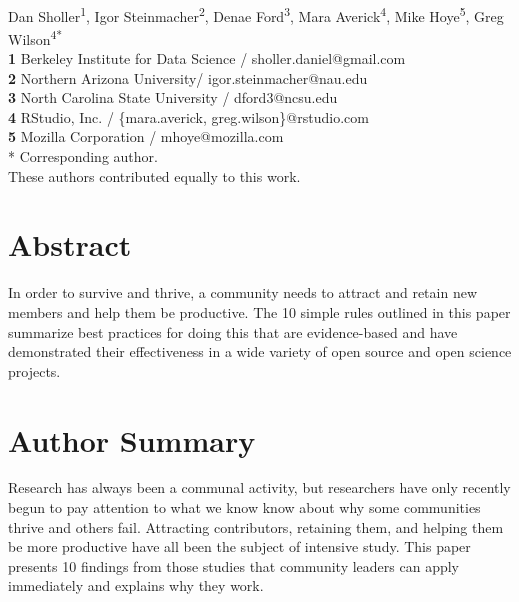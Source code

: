 \documentclass[10pt,letterpaper]{article}
\begin{document}
\vspace*{0.2in}

\begin{flushleft}
{\Large
\textbf{}
}
\newline
\\
{Dan Sholler}\textsuperscript{1{\ddag}},
{Igor Steinmacher}\textsuperscript{2{\ddag}},
{Denae Ford}\textsuperscript{3{\ddag}},
{Mara Averick}\textsuperscript{4{\ddag}},
{Mike Hoye}\textsuperscript{5{\ddag}},
{Greg Wilson}\textsuperscript{4{\ddag}*}
\\
\bigskip
\textbf{1} Berkeley Institute for Data Science / sholler.daniel@gmail.com \\
\textbf{2} Northern Arizona University/ igor.steinmacher@nau.edu \\\bigskip
\textbf{3} North Carolina State University / dford3@ncsu.edu \\
\textbf{4} RStudio, Inc. / \{mara.averick, greg.wilson\}@rstudio.com \\
\textbf{5} Mozilla Corporation / mhoye@mozilla.com \\
* Corresponding author. \\
\bigskip
{\ddag} These authors contributed equally to this work.
\end{flushleft}

\section*{Abstract}

In order to survive and thrive,
a community needs to attract and retain new members
and help them be productive.
The 10 simple rules outlined in this paper
summarize best practices for doing this
that are evidence-based and have demonstrated their effectiveness
in a wide variety of open source and open science projects.

\section*{Author Summary}

Research has always been a communal activity,
but researchers have only recently begun to pay attention to
what we know know about why some communities thrive and others fail.
Attracting contributors,
retaining them,
and helping them be more productive
have all been the subject of intensive study.
This paper presents 10 findings from those studies that community leaders can apply immediately
and explains why they work.
\end{document}

